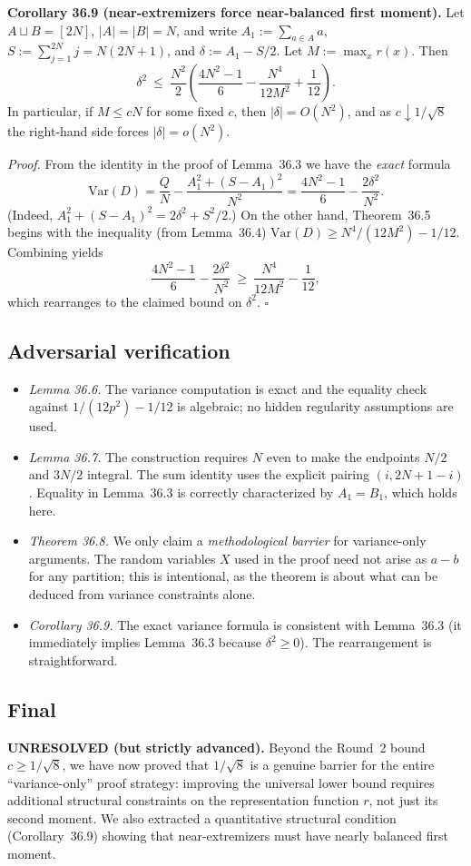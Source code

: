 \medskip
\noindent\textbf{Corollary 36.9 (near-extremizers force near-balanced first moment).}
Let \(A\sqcup B=[2N]\), \(|A|=|B|=N\), and write
\(A_1:=\sum_{a\in A} a\), \(S:=\sum_{j=1}^{2N} j=N(2N+1)\), and
\(\delta:=A_1-S/2\).
Let \(M:=\max_x r(x)\).
Then
\[
\delta^2\ \le\ \frac{N^2}{2}\left(\frac{4N^2-1}{6}-\frac{N^4}{12M^2}+\frac{1}{12}\right).
\]
In particular, if \(M\le cN\) for some fixed \(c\), then \(|\delta|=O(N^2)\), and as \(c\downarrow 1/\sqrt 8\) the right-hand side forces \(|\delta|=o(N^2)\).

\noindent\emph{Proof.}
From the identity in the proof of Lemma~36.3 we have the \emph{exact} formula
\[
\mathrm{Var}(D)=\frac{Q}{N}-\frac{A_1^2+(S-A_1)^2}{N^2}
=\frac{4N^2-1}{6}-\frac{2\delta^2}{N^2}.
\]
(Indeed, \(A_1^2+(S-A_1)^2=2\delta^2+S^2/2\).)
On the other hand, Theorem~36.5 begins with the inequality (from Lemma~36.4)
\(
\mathrm{Var}(D)\ge N^4/(12M^2)-1/12.
\)
Combining yields
\[
\frac{4N^2-1}{6}-\frac{2\delta^2}{N^2}\ \ge\ \frac{N^4}{12M^2}-\frac{1}{12},
\]
which rearranges to the claimed bound on \(\delta^2\).
\hfill$\square$

\subsection{Adversarial verification}
\begin{itemize}
\item \emph{Lemma 36.6.} The variance computation is exact and the equality check against \(1/(12p^2)-1/12\) is algebraic; no hidden regularity assumptions are used.
\item \emph{Lemma 36.7.} The construction requires \(N\) even to make the endpoints \(N/2\) and \(3N/2\) integral. The sum identity uses the explicit pairing \((i,2N+1-i)\). Equality in Lemma~36.3 is correctly characterized by \(A_1=B_1\), which holds here.
\item \emph{Theorem 36.8.} We only claim a \emph{methodological barrier} for variance-only arguments. The random variables \(X\) used in the proof need not arise as \(a-b\) for any partition; this is intentional, as the theorem is about what can be deduced from variance constraints alone.
\item \emph{Corollary 36.9.} The exact variance formula is consistent with Lemma~36.3 (it immediately implies Lemma~36.3 because \(\delta^2\ge 0\)). The rearrangement is straightforward.
\end{itemize}

\subsection{Final}
\textbf{UNRESOLVED (but strictly advanced).}
Beyond the Round~2 bound \(c\ge 1/\sqrt 8\), we have now proved that \(1/\sqrt 8\) is a genuine barrier for the entire ``variance-only'' proof strategy: improving the universal lower bound requires additional structural constraints on the representation function \(r\), not just its second moment.
We also extracted a quantitative structural condition (Corollary~36.9) showing that near-extremizers must have nearly balanced first moment.

